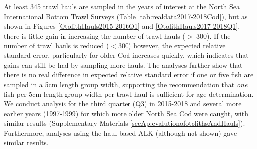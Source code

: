 \documentclass[a4paper 12pt]{article}
\numberwithin{equation}{section}
\begin{document}
At least 345 trawl hauls are sampled in the years of interest at the North Sea International Bottom Trawl Surveys (Table \ref{tab:realdata2017-2018Cod}), but as shown in Figures \ref{OtolithHauls2015-2016Q1} and  \ref{OtolithHauls2017-2018Q1}, there is little gain in increasing the number of trawl hauls ($>$ 300). If the number of trawl hauls is reduced ($< 300$) however, the expected relative standard error, particularly for older Cod increases quickly, which indicates that gains can still be had by sampling more hauls. The analyses further show that  there is no real difference in expected relative standard error if one or five fish are sampled in a 5cm length group width, supporting the recommendation that \textit{one} fish per 5cm length group width per trawl haul is sufficient for age determination. We conduct analysis for the third quarter (Q3) in 2015-2018 and several more earlier years (1997-1999) for which more older North Sea Cod were caught, with similar results (Supplementary Materials \ref{secAp:evalutionofotolithsAndHauls}). Furthermore, analyses using the haul based ALK (although not shown) gave similar results.

 
\end{document}
